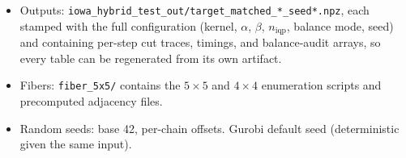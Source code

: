 \documentclass[11pt]{article}
\begin{document}
\begin{itemize}
    each caption; Table~\ref{tab:iowa-headline} sums per-step solve
    times, Table~\ref{tab:sensitivity} wraps whole runs.
  \item Outputs:
    \texttt{iowa\_hybrid\_test\_out/target\_matched\_*\_seed*.npz},
    each stamped with the full configuration (kernel, $\alpha$,
    $\beta$, $n_{\mathrm{iqp}}$, balance mode, seed) and containing
    per-step cut traces, timings, and balance-audit arrays, so every
    table can be regenerated from its own artifact.
  \item Fibers: \texttt{fiber\_5x5/} contains the $5 \times 5$ and
    $4 \times 4$ enumeration scripts and precomputed
    adjacency files.
  \item Random seeds: base 42, per-chain offsets. Gurobi default seed
    (deterministic given the same input).
\end{itemize}



\end{document}
